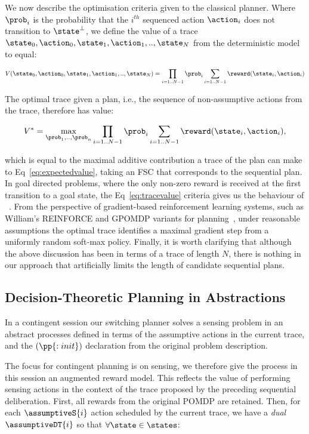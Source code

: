 We now describe the optimisation criteria given to the classical
planner. Where $\prob_i$ is the probability that the $i^{th}$
sequenced action $\action_i$ does not transition to $\state^\bot$, we
define the value of a trace
$\state_0, \action_0, \state_1, \action_1,.., \state_N$ from the
deterministic model to equal:

\begin{equation}\label{eq:tracevalue}
V(\state_0, \action_0, \state_1, \action_1,.., \state_N) =  \prod_{i=1..N-1} \prob_i \sum_{i=1..N-1} \reward(\state_i, \action_i)
\end{equation}

\noindent The optimal trace given a plan, i.e., the sequence of non-assumptive
actions from the trace, therefore has value:

\[
V^* = \max_{\prob_1, .., \prob_n} \prod_{i=1..N-1} \prob_i \sum_{i=1..N-1}
\reward(\state_i, \action_i),
\]

\noindent which is equal to the maximal additive contribution a trace of the plan can
make to Eq~\ref{eq:expectedvalue}, taking an FSC that corresponds to
the sequential plan.  In goal directed problems, where the only
non-zero reward is received at the first transition to a goal state,
the Eq~\ref{eq:tracevalue} criteria gives us the behaviour
of ~\cite{yoon:etal:2007}. From the perspective of
gradient-based reinforcement learning systems, such as William's
REINFORCE and GPOMDP variants for planning~\cite{olivier:doug:2009},
under reasonable assumptions the optimal trace identifies a maximal
gradient step from a uniformly random soft-max policy. Finally, it is
worth clarifying that although the above discussion has been in terms
of a trace of length $N$, there is nothing in our approach that
artificially limits the length of candidate sequential plans.


\subsection{Decision-Theoretic Planning in Abstractions}

In a contingent session our switching planner solves a sensing problem
in an abstract processes defined in terms of the assumptive actions in
the current trace, and the $(\pp{:init})$ declaration from the
original problem description.

The focus for contingent planning is on sensing, we therefore give the
process in this session an augmented reward model.  This reflects the
value of performing sensing actions in the context of the trace
proposed by the preceding sequential deliberation. First, all rewards
from the original POMDP are retained. Then, for each $\assumptiveS{i}$
action scheduled by the current trace, we have a {\em dual}
$\assumptiveDT{i}$ so that $\forall\state\in\states$:

